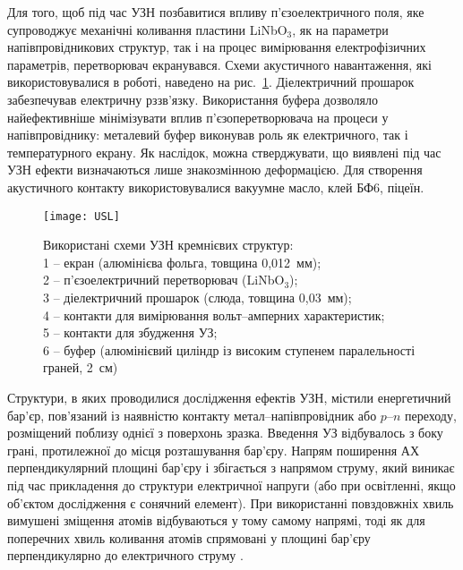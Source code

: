 Для того, щоб під час УЗН позбавитися впливу п'єзоелектричного поля, яке супроводжує механічні коливання пластини LiNbO$_3$,  як на параметри напівпровідникових структур, так і на процес вимірювання електрофізичних параметрів,
перетворювач екранувався.
Схеми акустичного навантаження, які використовувалися в роботі, наведено на рис.~\ref{figUSL}.
Діелектричний прошарок забезпечував електричну рззв'язку.
Використання буфера дозволяло найефективніше мінімізувати вплив п'єзоперетворювача на процеси у напівпровіднику:
металевий буфер виконував роль як електричного, так і температурного екрану.
Як наслідок, можна стверджувати, що виявлені під час УЗН ефекти визначаються лише знакозмінною деформацією.
Для створення акустичного контакту використовувалися вакуумне масло, клей БФ6, піцеїн.

\begin{figure}
\center
\texttt{[image: USL]}%
\caption{\label{figUSL}
Використані схеми УЗН кремнієвих структур: \protect\\
1 --  екран (алюмінієва фольга, товщина 0,012~мм);\protect\\
2 -- п'єзоелектричний перетворювач (LiNbO$_3$);\protect\\
3 -- діелектричний прошарок (слюда, товщина 0,03~мм);\protect\\
4 -- контакти для вимірювання вольт--амперних характеристик;\protect\\
5 -- контакти для збудження УЗ;\protect\\
6 -- буфер (алюмінієвий циліндр із високим ступенем паралельності граней, 2~см)
}
\end{figure}



Структури, в яких проводилися дослідження ефектів УЗН, містили енергетичний бар'єр, пов'язаний із наявністю контакту метал--напівпровідник або $p$--$n$ переходу, розміщений поблизу однієї з поверхонь зразка.
Введення УЗ відбувалось з боку грані, протилежної до місця розташування бар'єру.
 Напрям поширення АХ перпендикулярний площині бар'єру і збігається з напрямом струму, який виникає під час прикладення до структури електричної напруги (або при освітленні, якщо об'єктом дослідження є сонячний елемент).
  При використанні повздовжніх хвиль вимушені зміщення атомів відбуваються у тому самому напрямі, тоді як для поперечних хвиль коливання атомів спрямовані у площині бар'єру перпендикулярно до електричного струму .



